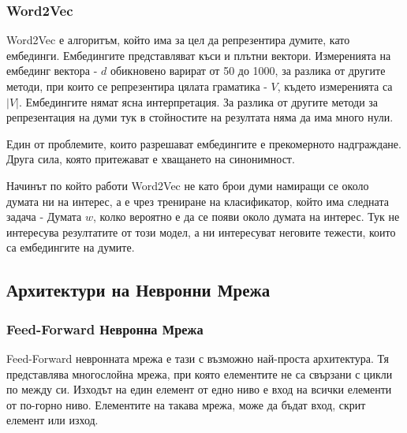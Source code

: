 \documentclass{article}
\begin{document}
\subsubsection{Word2Vec}

Word2Vec е алгоритъм, който има за цел да репрезентира думите, като ембединги. Ембедингите представляват къси и плътни
вектори. Измеренията на ембединг вектора - $d$ обикновено варират от 50 до 1000, за разлика от другите методи, при
които се репрезентира цялата граматика - $V$, където измеренията са $|V|$. Ембедингите нямат ясна интерпретация. За
разлика от другите методи за репрезентация на думи тук в стойностите на резултата няма да има много нули.

Един от проблемите, които разрешават ембедингите е прекомерното надграждане. Друга сила, която притежават е хващането
на синонимност.

Начинът по който работи Word2Vec не като брои думи намиращи се около думата ни на интерес, а е чрез трениране на
класификатор, който има следната задача - Думата $w$, колко вероятно е да се появи около думата на интерес. Тук не
интересува резултатите от този модел, а ни интересуват неговите тежести, които са ембедингите на думите.
\cite{intro-to-nlp-mit}

\subsection{Архитектури на Невронни Мрежа}

\subsubsection{Feed-Forward Невронна Мрежа}

Feed-Forward невронната мрежа е тази с възможно най-проста архитектура. Тя представлява многослойна мрежа, при която
елементите не са свързани с цикли по между си. Изходът на един елемент от едно ниво е вход на всички елементи от
по-горно ниво. Елементите на такава мрежа, може да бъдат вход, скрит елемент или изход. \cite{intro-to-nlp-stanford}
\end{document}
